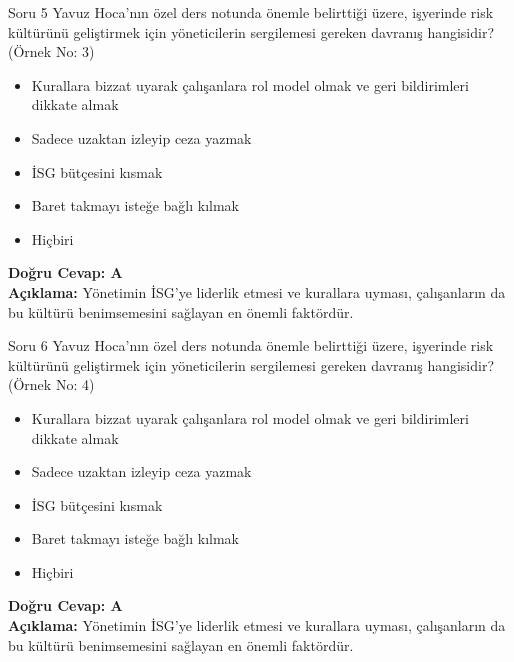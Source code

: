 \documentclass[12pt,a4paper]{article}
\begin{document}
\begin{testcard}{Soru 5}
    Yavuz Hoca'nın özel ders notunda önemle belirttiği üzere, işyerinde risk kültürünü geliştirmek için yöneticilerin sergilemesi gereken davranış hangisidir? (Örnek No: 3)
    \begin{itemize}
        \item[A)] Kurallara bizzat uyarak çalışanlara rol model olmak ve geri bildirimleri dikkate almak
        \item[B)] Sadece uzaktan izleyip ceza yazmak
        \item[C)] İSG bütçesini kısmak
        \item[D)] Baret takmayı isteğe bağlı kılmak
        \item[E)] Hiçbiri
    \end{itemize}
    \tcblower
    \textbf{Doğru Cevap: A} \\
    \textbf{Açıklama:} Yönetimin İSG'ye liderlik etmesi ve kurallara uyması, çalışanların da bu kültürü benimsemesini sağlayan en önemli faktördür.
\end{testcard}

\begin{testcard}{Soru 6}
    Yavuz Hoca'nın özel ders notunda önemle belirttiği üzere, işyerinde risk kültürünü geliştirmek için yöneticilerin sergilemesi gereken davranış hangisidir? (Örnek No: 4)
    \begin{itemize}
        \item[A)] Kurallara bizzat uyarak çalışanlara rol model olmak ve geri bildirimleri dikkate almak
        \item[B)] Sadece uzaktan izleyip ceza yazmak
        \item[C)] İSG bütçesini kısmak
        \item[D)] Baret takmayı isteğe bağlı kılmak
        \item[E)] Hiçbiri
    \end{itemize}
    \tcblower
    \textbf{Doğru Cevap: A} \\
    \textbf{Açıklama:} Yönetimin İSG'ye liderlik etmesi ve kurallara uyması, çalışanların da bu kültürü benimsemesini sağlayan en önemli faktördür.
\end{testcard}
\end{document}
